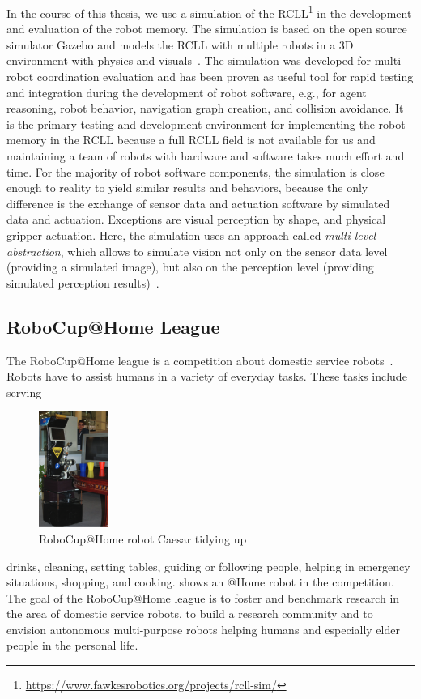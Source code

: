 In the course of this thesis, we use a simulation of the
RCLL\footnote{\url{https://www.fawkesrobotics.org/projects/rcll-sim/}}
in the development and evaluation of the robot memory. The simulation
is based on the open source simulator Gazebo and models the RCLL with
multiple robots in a 3D environment with physics and
visuals~\cite{Gazebo-Design,Gazsim-Thesis,LLSF-Sim}. The simulation
was developed for multi-robot coordination evaluation and has
been proven as useful tool for rapid testing and integration during
the development of robot software, e.g., for agent reasoning, robot
behavior, navigation graph creation, and collision avoidance. It is
the primary testing and development environment for implementing the
robot memory in the RCLL because a full RCLL field is not available for us and
maintaining a team of robots with hardware and software takes much
effort and time. For the majority of robot software components, the
simulation is close enough to reality to yield similar results and
behaviors, because the only difference is the exchange of sensor data
and actuation software by simulated data and actuation. Exceptions are
visual perception by shape, and physical gripper actuation. Here, the
simulation uses an approach called \emph{multi-level abstraction},
which allows to simulate vision not only on the sensor data level
(providing a simulated image), but also on the perception level
(providing simulated perception results)~\cite{Multi-Level-Abstraction}.

\subsection{RoboCup@Home League}
The RoboCup@Home league is a competition about domestic service
robots~\cite{wisspeintner2009robocup}. Robots have to assist
humans in a variety of everyday tasks. These tasks include
serving
\begin{figure}
  \centering
  \includegraphics[width=0.2\textwidth]{img/ceasar}%
  \caption[RoboCup@Home robot Caesar tidying up]{RoboCup@Home robot Caesar tidying up~\cite{wisspeintner2009robocup}}
  \vspace{-3mm}
  \label{fig:athome}
\end{figure}
drinks, cleaning, setting tables, guiding or following people,
helping in emergency situations, shopping, and cooking.
 shows an @Home robot in the
competition.
%
The goal of the RoboCup@Home league is to foster and benchmark
research in the area of domestic service robots, to build a research
community and to envision autonomous multi-purpose robots helping
humans and especially elder people in the personal life.

